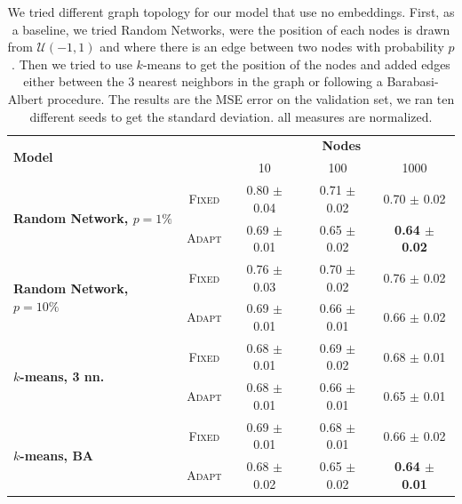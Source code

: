 \documentclass[a4paper,10pt]{article}
\begin{document}
\begin{table}
  \centering
  \begin{tabular}{lcccc} \toprule
    \multirow{2}{*}{\textbf{Model}}                      &                            & \multicolumn{3}{c}{\textbf{Nodes}}                                                           \\ \cmidrule(lr){3-5}
                                                         &                            & 10                                 & 100                    & 1000                           \\ \hline
    \multirow{2}{*}{\textbf{Random Network, $p=1\%$} }   & \scriptsize \textsc{Fixed} & 0.80  \tiny $\pm$ 0.04             & 0.71  \tiny $\pm$ 0.02 & 0.70 \tiny $\pm$ 0.02          \\
                                                         & \scriptsize \textsc{Adapt} & 0.69 \tiny $\pm$ 0.01              & 0.65 \tiny $\pm$ 0.02  & \textbf{0.64 \tiny $\pm$ 0.02} \\
    \multirow{2}{*}{\textbf{Random Network, $p=10\%$}}   & \scriptsize \textsc{Fixed} & 0.76  \tiny $\pm$ 0.03             & 0.70  \tiny $\pm$ 0.02 & 0.76 \tiny $\pm$ 0.02          \\
                                                         & \scriptsize \textsc{Adapt} & 0.69 \tiny $\pm$ 0.01              & 0.66 \tiny $\pm$ 0.01  & 0.66 \tiny $\pm$ 0.02          \\
    \multirow{2}{*}{\textbf{$k$-means, 3 nn.}          } & \scriptsize \textsc{Fixed} & 0.68  \tiny $\pm$ 0.01             & 0.69  \tiny $\pm$ 0.02 & 0.68 \tiny $\pm$ 0.01          \\
                                                         & \scriptsize \textsc{Adapt} & 0.68 \tiny $\pm$ 0.01              & 0.66 \tiny $\pm$ 0.01  & 0.65 \tiny $\pm$ 0.01          \\
    \multirow{2}{*}{\textbf{$k$-means, BA}             } & \scriptsize \textsc{Fixed} & 0.69  \tiny $\pm$ 0.01             & 0.68  \tiny $\pm$ 0.01 & 0.66 \tiny $\pm$ 0.02          \\
                                                         & \scriptsize \textsc{Adapt} & 0.68 \tiny $\pm$ 0.02              & 0.65 \tiny $\pm$ 0.02  & \textbf{0.64 \tiny $\pm$ 0.01} \\

    \bottomrule
  \end{tabular}
  \caption{
    We tried different graph topology for our model that use no embeddings. First, as a baseline, we tried Random Networks, were the position of each nodes is drawn from $\mathcal{U}(-1,1)$ and where there is an edge between two nodes with probability $p$. Then we tried to use $k$-means to get the position of the nodes and added edges either between the 3 nearest neighbors in the graph or following a Barabasi-Albert procedure. The results are the MSE error on the validation set, we ran ten different seeds to get the standard deviation. all measures are normalized.
  }
  \label{tab:graphs}
\end{table}
\end{document}
